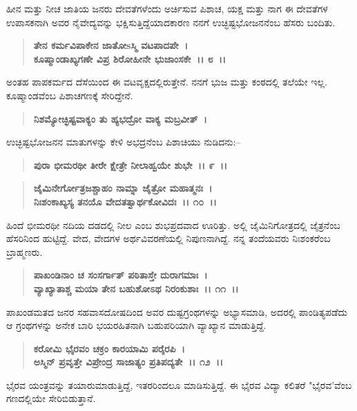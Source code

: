 ಹೀನ ಮತ್ತು ನೀಚ ಜಾತಿಯ ಜನರು ದೇವತೆಗಳೆಂದು ಅರ್ಚಿಸುವ ಪಿಶಾಚ, ಯಕ್ಷ ಮತ್ತು ನಾಗ ಈ ದೇವತೆಗಳ ಉಪಾಸಕನಾಗಿ ಅವರ ನೈವೇದ್ಯವನ್ನು ಭಕ್ಷಿಸುತ್ತಿದ್ದೆಯಾದಕಾರಣ ನನಗೆ ಉಚ್ಛಿಷ್ಟಭೋಜನನೆಂಬ ಹೆಸರು ಬಂದಿತು.

\begin{verse}
\textbf{ತೇನ ಕರ್ಮವಿಪಾಕೇನ ಜಾತೋsಸ್ಮಿ ವಟಪಾದಪೇ~।}\\\textbf{ಕೂಷ್ಮಾಂಡಾಖ್ಯಗಣೇ ವಿಪ್ರ ಶಿರೋಹೀನೇ ಭುಜಾಂಸಕೇ~।। ೮~।।}
\end{verse}

ಅಂತಹ ಪಾಪಕರ್ಮದ ದೆಸೆಯಿಂದ ಈ ವಟವೃಕ್ಷದಲ್ಲಿರುತ್ತೇನೆ. ನನಗೆ ಭುಜ ಮತ್ತು ಕಂಠದಲ್ಲಿ ತಲೆಯೇ ಇಲ್ಲ. ಕೂಷ್ಮಾಂಡವೆಂಬ ಪಿಶಾಚಗಣಕ್ಕೆ ಸೇರಿದ್ದೇನೆ.

\begin{verse}
\textbf{ನಿಶಮ್ಯೋಚ್ಛಿಷ್ಟವಾಕ್ಯಂ ತು ಹ್ಯಭದ್ರೋ ವಾಕ್ಯ ಮಬ್ರವೀತ್~। }
\end{verse}

ಉಚ್ಛಿಷ್ಟಭೋಜನನ ಮಾತುಗಳನ್ನು ಕೇಳಿ ಅಭದ್ರನೆಂಬ ಪಿಶಾಚಿಯು ನುಡಿದನು:–

\begin{verse}
\textbf{ಪುರಾ ಭೀಮರಥೀ ತೀರೇ ಕ್ಷೇತ್ರೇ ನೀಲಾಹ್ವಯೇ ಶುಭೇ~।। ೯~।।} 
\end{verse}

\begin{verse}
\textbf{ಜೈಮಿನೇರ್ಗೋತ್ರಜಶ್ಚಾಹಂ ನಾಮ್ನಾ ಜೈತ್ರೋ ಮಹಾತ್ಮನಃ~।}\\\textbf{ನಿಃಶಂಕಾಖ್ಯಸ್ಯ ತನಯೊ ವೇದತತ್ವಾರ್ಥಕೋವಿದಃ~।। ೧೦~।।}
\end{verse}

ಹಿಂದೆ ಭೀಮರಥೀ ನದಿಯ ದಡದಲ್ಲಿ ನೀಲ ಎಂಬ ಶುಭಪ್ರದವಾದ ಊರಿತ್ತು. ಅಲ್ಲಿ ಜೈಮಿನಿ\-ಗೋತ್ರದಲ್ಲಿ ಜೈತ್ರನೆಂಬ ಹೆಸರಿನಿಂದ ಹುಟ್ಟಿದ್ದೆ. ವೇದ, ವೇದಗಳ ಅರ್ಥವಿವರಣೆಯಲ್ಲಿ ನಿಪುಣನಾಗಿದ್ದೆ. ನನ್ನ ತಂದೆಯವರು ನಿಃಶಂಕರೆಂಬ ಬ್ರಾಹ್ಮಣರು.

\begin{verse}
\textbf{ಪಾಖಂಡಿನಾಂ ಚ ಸಂಸರ್ಗಾತ್ ಪಠಿತಾಸ್ತೇ ದುರಾಗಮಾಃ~।}\\\textbf{ವ್ಯಾಖ್ಯಾತಾಶ್ಚ ಮಯಾ ತೇನ ಬಹುಶೋಽಥ ನಿರಂಕುಶಾಃ~।। ೧೧~।।}
\end{verse}

ಪಾಖಂಡಮತದ ಜನರ ಸಹವಾಸದೋಷದಿಂದ ಅವರ ದುಷ್ಟಗ್ರಂಥಗಳನ್ನು ಅಭ್ಯಾಸಮಾಡಿ, ಅದರಲ್ಲಿ ಪಾಂಡಿತ್ಯಪಡೆದು ಆ ಗ್ರಂಥಗಳನ್ನು ಅನೇಕ ಬಾರಿ ಭಯರಹಿತನಾಗಿ ಬಹುಪರಿಯಾಗಿ ವ್ಯಾಖ್ಯಾನ ಮಾಡುತ್ತಿದ್ದೆ.

\begin{verse}
\textbf{ಕರೋಮಿ ಭೈರವಂ ಚಕ್ರಂ ಕಾರಯಾಮಿ ಪರೈರಪಿ~।}\\\textbf{ಅಸ್ಮಿನ್ ಪ್ರವೃತ್ತೇ ವಿಪ್ರೇಂದ್ರ ಸಾಜಾತ್ಯಂ ಪ್ರತಿಪದ್ಯತೇ~।। ೧೨~।।}
\end{verse}

ಭೈರವ ಯಂತ್ರವನ್ನು ತಯಾರುಮಾಡುತ್ತಿದ್ದೆ, ಇತರರಿಂದಲೂ ಮಾಡಿಸುತ್ತಿದ್ದೆ. ಈ ಭೈರವ ವಿದ್ಯಾ ಕಲಿತರೆ "ಭೈರವ'ವೆಂಬ ಗಣದಲ್ಲಿಯೇ ಸೇರಿಬಿಡುತ್ತಾನೆ.


